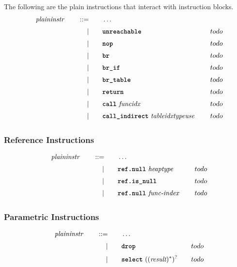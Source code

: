 The following are the plain instructions that interact with instruction blocks.
\begin{alignat*}{9}
    && \textit{plaininstr}\ &&\quad ::= &\quad && \dots \quad &&  \\[1mm]
    &&       &&\quad | &\quad && \textbf{\texttt{unreachable}}\ \quad && todo \\[1mm]
    &&       &&\quad | &\quad && \textbf{\texttt{nop}}\ \quad && todo \\[1mm]
    &&       &&\quad | &\quad && \textbf{\texttt{br}}\ \quad && todo \\[1mm]
    &&       &&\quad | &\quad && \textbf{\texttt{br\textunderscore if}}\ \quad && todo \\[1mm]
    &&       &&\quad | &\quad && \textbf{\texttt{br\textunderscore table}}\ \quad && todo \\[1mm]
    &&       &&\quad | &\quad && \textbf{\texttt{return}}\ \quad && todo \\[1mm]
    &&       &&\quad | &\quad && \textbf{\texttt{call}}\ \textit{funcidx}\ \quad && todo \\[1mm]
    &&       &&\quad | &\quad && \textbf{\texttt{call\textunderscore indirect}}\ \textit{tableidx} \textit{typeuse}\ \quad && todo \\[1mm]
\end{alignat*}
\subsubsection{Reference Instructions}

\begin{alignat*}{9}
    && \textit{plaininstr}\ &&\quad ::= &\quad && \dots \quad &&  \\[1mm]
    &&       &&\quad | &\quad && \textbf{\texttt{ref.null}}\ \textit{heaptype}\ \quad && todo \\[1mm]
    &&       &&\quad | &\quad && \textbf{\texttt{ref.is\textunderscore null}}\ \quad && todo \\[1mm]
    &&       &&\quad | &\quad && \textbf{\texttt{ref.null}}\ \textit{func-index}\ \quad && todo \\[1mm]
\end{alignat*}

\subsubsection{Parametric Instructions}
\begin{alignat*}{9}
    && \textit{plaininstr}\ &&\quad ::= &\quad && \dots \quad &&  \\[1mm]
    &&       &&\quad | &\quad && \textbf{\texttt{drop}} \quad && todo \\[1mm]
    &&       &&\quad | &\quad && \textbf{\texttt{select}}\ ((\textit{result})^*)^? \quad && todo \\[1mm]
\end{alignat*}

